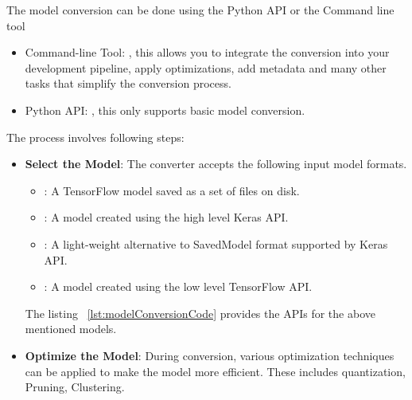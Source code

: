 The model conversion can be done using the Python API or the Command
line tool
\begin{itemize}
	\item Command-line Tool: , this allows you to integrate the conversion into your development pipeline, apply optimizations, add metadata and many other tasks that simplify the conversion process.
	\item Python API: , this only supports basic model conversion.
\end{itemize}

The process involves following steps:
\begin{itemize}
	\item \textbf{Select the Model}: The converter accepts the following input model formats.
	\begin{itemize}
		\item {}: A TensorFlow model saved as a set of files on disk.
		\item {}: A model created using the high level Keras API.
		\item {}: A light-weight alternative to SavedModel format supported by Keras API.
		\item {}: A model created using the low level TensorFlow API.
	\end{itemize}
	The listing ~\ref{lst:modelConversionCode} provides the APIs for the above mentioned models. \cite{TensorFlowLiteInference:2024}
	
\begin{code}
	
\end{code}
	
	\item \textbf{Optimize the Model}: During conversion, various optimization techniques can be applied to make the model more efficient. These includes quantization, Pruning, Clustering.
\end{itemize}

